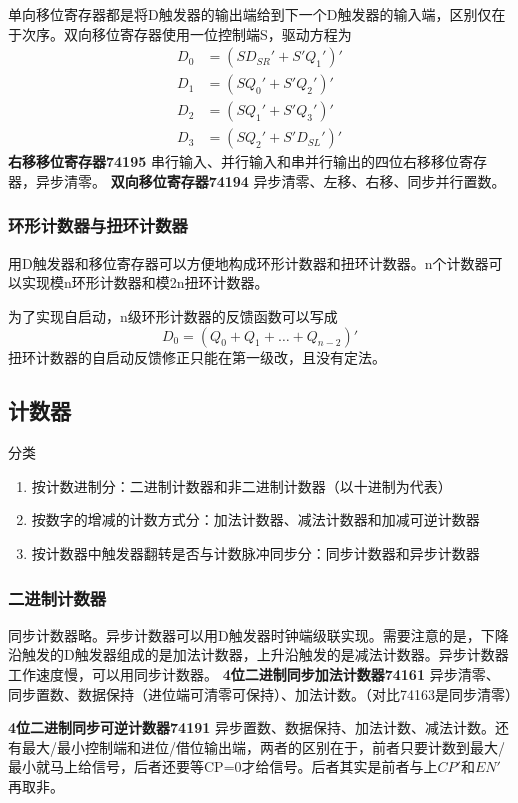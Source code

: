 \documentclass{ctexart}
\newcommand*{\noindbf}[1]{{\noindent \bf{#1} \qquad}}
\begin{document}
单向移位寄存器都是将D触发器的输出端给到下一个D触发器的输入端，区别仅在于次序。双向移位寄存器使用一位控制端S，驱动方程为
\begin{align}
    D_0&=(SD_{SR}'+S'Q_1')'\\
    D_1&=(SQ_0'+S'Q_2')'\\
    D_2&=(SQ_1'+S'Q_3')'\\
    D_3&=(SQ_2'+S'D_{SL}')'
\end{align}
\noindbf{右移移位寄存器74195}
串行输入、并行输入和串并行输出的四位右移移位寄存器，异步清零。
\noindbf{双向移位寄存器74194}
异步清零、左移、右移、同步并行置数。{\color{blue}{移位寄存器可以用于串并行数据的转换，也可以用于构造环形/扭环计数器，还可以用于算数运算（二进制乘除相当于移位）和数据延迟}}
\subsubsection{环形计数器与扭环计数器}
用D触发器和移位寄存器可以方便地构成环形计数器和扭环计数器。n个计数器可以实现模n环形计数器和模2n扭环计数器。

为了实现自启动，n级环形计数器的反馈函数可以写成
\begin{equation}
    D_0=(Q_0+Q_1+\dots+Q_{n-2})'
\end{equation}
扭环计数器的自启动反馈修正只能在第一级改，且没有定法。
\subsection{计数器}
分类
\begin{enumerate}
    \item 按计数进制分：二进制计数器和非二进制计数器（以十进制为代表）
    \item 按数字的增减的计数方式分：加法计数器、减法计数器和加减可逆计数器
    \item 按计数器中触发器翻转是否与计数脉冲同步分：同步计数器和异步计数器
\end{enumerate}
\subsubsection{二进制计数器}
同步计数器略。异步计数器可以用D触发器时钟端级联实现。需要注意的是，下降沿触发的D触发器组成的是加法计数器，上升沿触发的是减法计数器。异步计数器工作速度慢，可以用同步计数器。
\noindbf{4位二进制同步加法计数器74161}异步清零、同步置数、数据保持（进位端可清零可保持）、加法计数。（对比74163是同步清零）

\noindbf{4位二进制同步可逆计数器74191}异步置数、数据保持、加法计数、减法计数。还有最大/最小控制端和进位/借位输出端，两者的区别在于，前者只要计数到最大/最小就马上给信号，后者还要等CP=0才给信号。后者其实是前者与上$CP'$和$EN'$再取非。
\end{document}

